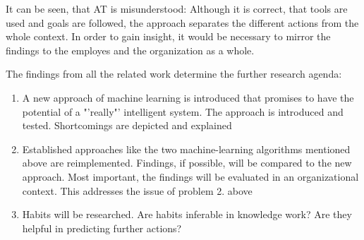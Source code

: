 It can be seen, that \ac{AT} is misunderstood: Although it is correct, that tools are used and goals are followed, the approach separates the different actions from the whole context. In order to gain insight, it would be necessary to mirror the findings to the employes and the organization as a whole.

The findings from all the related work determine the further research agenda:
\begin{enumerate}
  \item A new approach of machine learning is introduced that promises to have the potential of a "'really"' intelligent system. The approach is introduced and tested. Shortcomings are depicted and explained
  \item Established approaches like the two machine-learning algorithms mentioned above are reimplemented. Findings, if possible, will be compared to the new approach. Most important, the findings will be evaluated in an organizational context. This addresses the issue of problem 2. above
  \item Habits will be researched. Are habits inferable in knowledge work? Are they helpful in predicting further actions? 
\end{enumerate}
